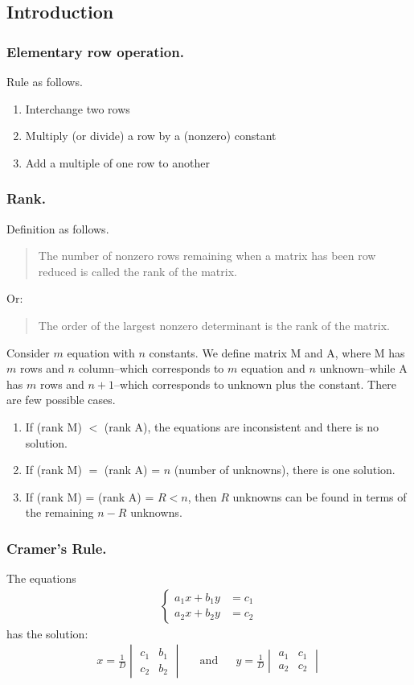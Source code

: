 \documentclass[../../../main.tex]{subfiles}
\begin{document}
\subsection{Introduction}
\subsubsection{Elementary row operation.}
Rule as follows.
\begin{enumerate}
	\item Interchange two rows
	\item Multiply (or divide) a row by a (nonzero) constant
	\item Add a multiple of one row to another
\end{enumerate}

\subsubsection{Rank.}
Definition as follows.
\begin{quote}
	The number of nonzero rows remaining when a matrix has been row reduced is called the rank of the matrix.
\end{quote}
Or:
\begin{quote}
	The order of the largest nonzero determinant is the rank of the matrix.
\end{quote}

Consider $m$ equation with $n$ constants. We define matrix M and A, where M has $m$ rows and $n$ column--which corresponds to $m$ equation and $n$ unknown--while A has $m$ rows and $n+1$--which corresponds to unknown plus the constant. There are few possible cases.
\begin{enumerate}
	\item If (rank M) $<$ (rank A), the equations are inconsistent and there is no solution.
	\item If (rank M) $=$ (rank A) = $n$ (number of unknowns), there is one solution.
	\item If (rank M) = (rank A) = $R < n$, then $R$ unknowns can be found in terms of the remaining $n-R$ unknowns.
\end{enumerate}

\subsubsection{Cramer's Rule.} The equations
\begin{align*}
	\begin{cases}
		a_1x+b_1y & =c_1 \\
		a_2x+b_2y & =c_2
	\end{cases}
\end{align*}
has the solution:
\begin{align*}
	x=\frac{1}{D}
	\begin{vmatrix}
		c_1 & b_1 \\
		c_2 & b_2
	\end{vmatrix} &  & \mathrm{and} &  &
	y=\frac{1}{D}
	\begin{vmatrix}
		a_1 & c_1 \\
		a_2 & c_2
	\end{vmatrix}
\end{align*}
\end{document}
